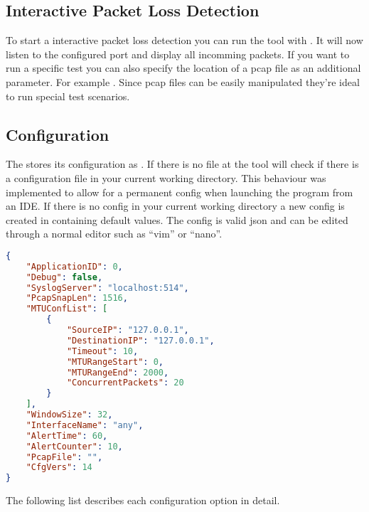 \subsection{Interactive Packet Loss Detection}
To start a interactive packet loss detection you can run the tool with . It will now listen to the configured port and display all incomming packets. If you want to run a specific test you can also specify the location of a pcap file as an additional parameter. For example . Since pcap files can be easily manipulated they're ideal to run special test scenarios.
\clearpage
\subsection{Configuration}
The \entool{} stores its configuration as . If there is no  file at  the tool will check if there is a configuration file in your current working directory. This behaviour was implemented to allow for a permanent config when launching the program from an \acs{IDE}. If there is no config in your current working directory a new config is created in  containing default values.
The config is valid json and can be edited through a normal editor such as \enquote{vim} or \enquote{nano}.

\begin{lstlisting}[language=json, caption=Sample configuration]
{
    "ApplicationID": 0,
    "Debug": false,
    "SyslogServer": "localhost:514",
    "PcapSnapLen": 1516,
    "MTUConfList": [
        {
            "SourceIP": "127.0.0.1",
            "DestinationIP": "127.0.0.1",
            "Timeout": 10,
            "MTURangeStart": 0,
            "MTURangeEnd": 2000,
            "ConcurrentPackets": 20
        }
    ],
    "WindowSize": 32,
    "InterfaceName": "any",
    "AlertTime": 60,
    "AlertCounter": 10,
    "PcapFile": "", 
    "CfgVers": 14
}
\end{lstlisting}

The following list describes each configuration option in detail.

